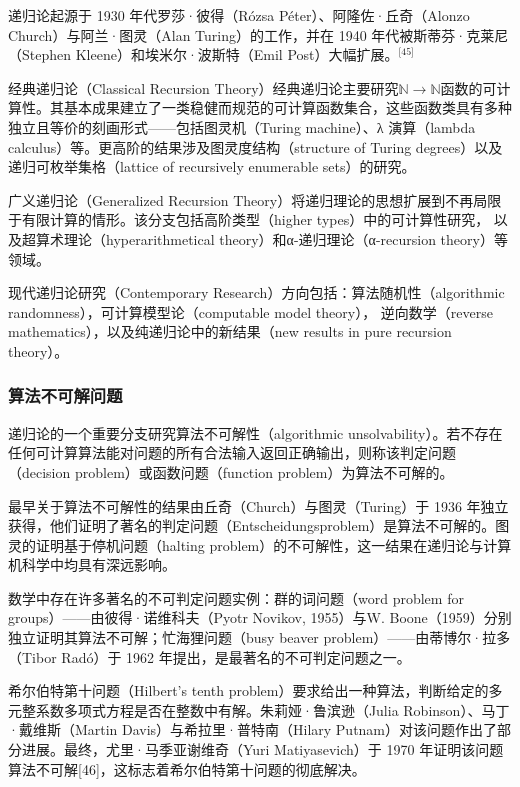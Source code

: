 递归论起源于 1930 年代罗莎·彼得（Rózsa Péter）、阿隆佐·丘奇（Alonzo Church）与阿兰·图灵（Alan Turing）的工作，并在 1940 年代被斯蒂芬·克莱尼（Stephen Kleene）和埃米尔·波斯特（Emil Post）大幅扩展。\(^\text{[45]}\)

经典递归论（Classical Recursion Theory）经典递归论主要研究\(\mathbb{N} \to \mathbb{N}\)函数的可计算性。其基本成果建立了一类稳健而规范的可计算函数集合，这些函数类具有多种独立且等价的刻画形式——包括图灵机（Turing machine）、λ 演算（lambda calculus）等。更高阶的结果涉及图灵度结构（structure of Turing degrees）以及递归可枚举集格（lattice of recursively enumerable sets）的研究。

广义递归论（Generalized Recursion Theory）将递归理论的思想扩展到不再局限于有限计算的情形。该分支包括高阶类型（higher types）中的可计算性研究，
以及超算术理论（hyperarithmetical theory）和α-递归理论（α-recursion theory）等领域。

现代递归论研究（Contemporary Research）方向包括：算法随机性（algorithmic randomness），可计算模型论（computable model theory），
逆向数学（reverse mathematics），以及纯递归论中的新结果（new results in pure recursion theory）。
\subsubsection{算法不可解问题}
递归论的一个重要分支研究算法不可解性（algorithmic unsolvability）。若不存在任何可计算算法能对问题的所有合法输入返回正确输出，则称该判定问题（decision problem）或函数问题（function problem）为算法不可解的。

最早关于算法不可解性的结果由丘奇（Church）与图灵（Turing）于 1936 年独立获得，他们证明了著名的判定问题（Entscheidungsproblem）是算法不可解的。图灵的证明基于停机问题（halting problem）的不可解性，这一结果在递归论与计算机科学中均具有深远影响。

数学中存在许多著名的不可判定问题实例：群的词问题（word problem for groups）——由彼得·诺维科夫（Pyotr Novikov, 1955）与W. Boone（1959）分别独立证明其算法不可解；忙海狸问题（busy beaver problem）——由蒂博尔·拉多（Tibor Radó）于 1962 年提出，是最著名的不可判定问题之一。

希尔伯特第十问题（Hilbert’s tenth problem）要求给出一种算法，判断给定的多元整系数多项式方程是否在整数中有解。朱莉娅·鲁滨逊（Julia Robinson）、马丁·戴维斯（Martin Davis）与希拉里·普特南（Hilary Putnam）对该问题作出了部分进展。最终，尤里·马季亚谢维奇（Yuri Matiyasevich）于 1970 年证明该问题算法不可解[46]，这标志着希尔伯特第十问题的彻底解决。
